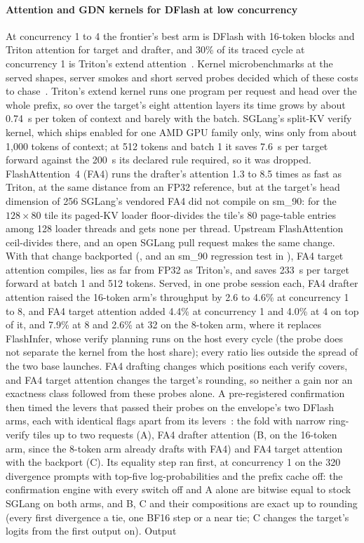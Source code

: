 \paragraph{Attention and GDN kernels for DFlash at low concurrency}\label{sec:stack-lowc} At concurrency 1 to 4 the frontier's best arm is DFlash with 16-token blocks and Triton attention for target and drafter, and 30\% of its traced cycle at concurrency 1 is Triton's extend attention~. Kernel microbenchmarks at the served shapes, server smokes and short served probes decided which of these costs to chase~. Triton's extend kernel runs one program per request and head over the whole prefix, so over the target's eight attention layers its time grows by about 0.74~\textmu s per token of context and barely with the batch. SGLang's split-KV verify kernel, which ships enabled for one AMD GPU family only, wins only from about 1,000 tokens of context; at 512 tokens and batch 1 it saves 7.6~\textmu s per target forward against the 200~\textmu s its declared rule required, so it was dropped. FlashAttention~4 (FA4) runs the drafter's attention 1.3 to 8.5 times as fast as Triton, at the same distance from an FP32 reference, but at the target's head dimension of 256 SGLang's vendored FA4 did not compile on sm\_90: for the $128\times80$ tile its paged-KV loader floor-divides the tile's 80 page-table entries among 128 loader threads and gets none per thread. Upstream FlashAttention ceil-divides there, and an open SGLang pull request makes the same change. With that change backported (, and an sm\_90 regression test in ), FA4 target attention compiles, lies as far from FP32 as Triton's, and saves 233~\textmu s per target forward at batch 1 and 512 tokens. Served, in one probe session each, FA4 drafter attention raised the 16-token arm's throughput by 2.6 to 4.6\% at concurrency 1 to 8, and FA4 target attention added 4.4\% at concurrency 1 and 4.0\% at 4 on top of it, and 7.9\% at 8 and 2.6\% at 32 on the 8-token arm, where it replaces FlashInfer, whose verify planning runs on the host every cycle (the probe does not separate the kernel from the host share); every ratio lies outside the spread of the two base launches. FA4 drafting changes which positions each verify covers, and FA4 target attention changes the target's rounding, so neither a gain nor an exactness class followed from these probes alone. A pre-registered confirmation then timed the levers that passed their probes on the envelope's two DFlash arms, each with identical flags apart from its levers~: the fold with narrow ring-verify tiles up to two requests (A), FA4 drafter attention (B, on the 16-token arm, since the 8-token arm already drafts with FA4) and FA4 target attention with the backport (C). Its equality step ran first, at concurrency 1 on the 320 divergence prompts with top-five log-probabilities and the prefix cache off: the confirmation engine with every switch off and A alone are bitwise equal to stock SGLang on both arms, and B, C and their compositions are exact up to rounding (every first divergence a tie, one BF16 step or a near tie; C changes the target's logits from the first output on). Output 